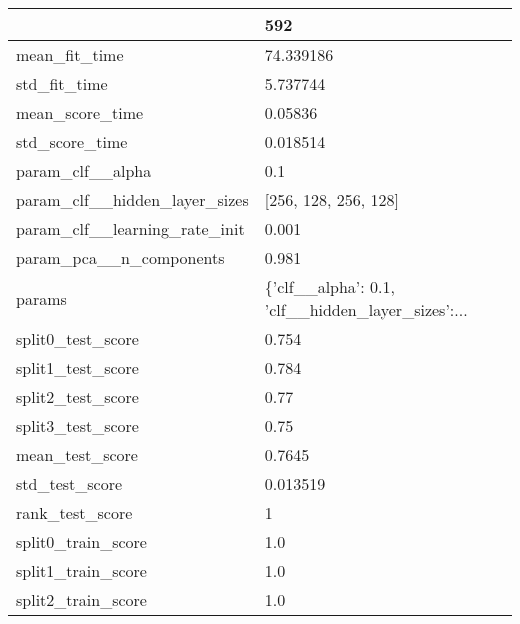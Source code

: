 \begin{tabular}{ll}
\toprule
{} &                                                592 \\
\midrule
mean\_fit\_time                 &                                          74.339186 \\
std\_fit\_time                  &                                           5.737744 \\
mean\_score\_time               &                                            0.05836 \\
std\_score\_time                &                                           0.018514 \\
param\_clf\_\_alpha              &                                                0.1 \\
param\_clf\_\_hidden\_layer\_sizes &                               [256, 128, 256, 128] \\
param\_clf\_\_learning\_rate\_init &                                              0.001 \\
param\_pca\_\_n\_components       &                                              0.981 \\
params                        &  \{'clf\_\_alpha': 0.1, 'clf\_\_hidden\_layer\_sizes':... \\
split0\_test\_score             &                                              0.754 \\
split1\_test\_score             &                                              0.784 \\
split2\_test\_score             &                                               0.77 \\
split3\_test\_score             &                                               0.75 \\
mean\_test\_score               &                                             0.7645 \\
std\_test\_score                &                                           0.013519 \\
rank\_test\_score               &                                                  1 \\
split0\_train\_score            &                                                1.0 \\
split1\_train\_score            &                                                1.0 \\
split2\_train\_score            &                                                1.0 \\

\end{tabular}

